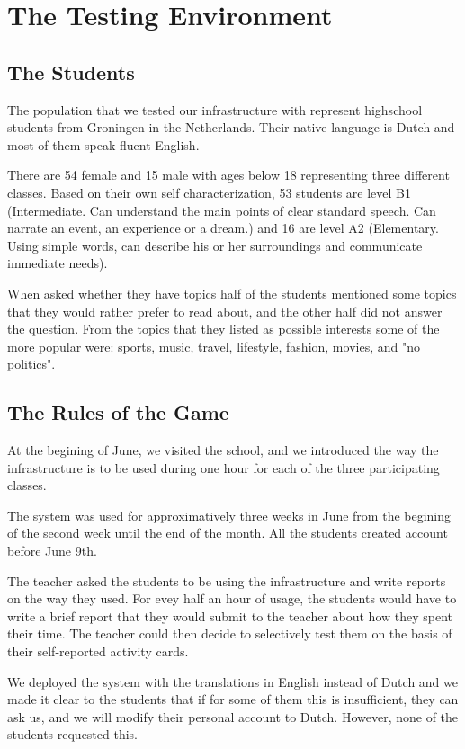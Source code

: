 
\newpage
\section{The Testing Environment}

\subsection{The Students}
The population that we tested our infrastructure with represent \stcnt highschool students from Groningen in the Netherlands. Their native language is Dutch and most of them speak fluent English. 


There are 54 female and 15 male with ages below 18 representing three different classes. Based on their own self characterization, 53 students are level B1 (Intermediate. Can understand the main points of clear standard speech. Can narrate an event, an experience or a dream.) and 16 are level A2 (Elementary. Using simple words, can describe his or her surroundings and communicate immediate needs). 


When asked whether they have topics half of the students mentioned some topics that they would rather prefer to read about, and the other half did not answer the question. From the topics that they listed as possible interests some of the more popular were: sports, music, travel, lifestyle, fashion, movies, and "no politics".


\subsection {The Rules of the Game}

At the begining of June, we visited the school, and we introduced the
way the infrastructure is to be used during one hour for each of the three participating classes.


The system was used for approximatively three weeks in June from the begining of the second week until the end of the month. All the students created account before June 9th. 

The teacher asked the students to be using the infrastructure and write reports on the way they used. For evey half an hour of usage, the students would have to write a brief report that they would submit to the teacher about how they spent their time. The teacher could then decide to selectively test them on the basis of their self-reported activity cards.

We deployed the system with the translations in English instead of Dutch and we made it clear to the students that if for some of them this is insufficient, they can ask us, and we will modify their personal account to Dutch. However, none of the students requested this.






